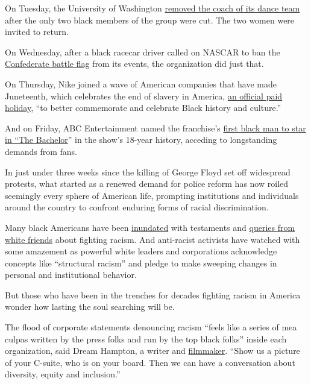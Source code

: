 On Tuesday, the University of Washington
\href{https://www.seattletimes.com/sports/uw-huskies/uw-removes-dance-coach-asks-black-members-to-rejoin-team-and-pledges-to-include-diversity-in-tryout-process/?utm_medium=notification\&utm_source=pushly\&utm_campaign=564808}{removed
the coach of its dance team} after the only two black members of the
group were cut. The two women were invited to return.

On Wednesday, after a black racecar driver called on NASCAR to ban the
\href{https://www.nytimes.com/news-event/confederate-flags-monuments-statues}{Confederate
battle flag} from its events, the organization did just that.

On Thursday, Nike joined a wave of American companies that have made
Juneteenth, which celebrates the end of slavery in America,
\href{https://www.nytimes.com/aponline/2020/06/12/business/ap-juneteenth-company-holiday.html}{an
official paid holiday}, ``to better commemorate and celebrate Black
history and culture.''

And on Friday, ABC Entertainment named the franchise's
\href{https://www.nytimes.com/2020/06/12/arts/television/matt-james-black-bachelor.html}{first
black man to star in ``The Bachelor}'' in the show's 18-year history,
acceding to longstanding demands from fans.

In just under three weeks since the killing of George Floyd set off
widespread protests, what started as a renewed demand for police reform
has now roiled seemingly every sphere of American life, prompting
institutions and individuals around the country to confront enduring
forms of racial discrimination.

Many black Americans have been
\href{https://medium.com/the-faculty/white-academia-do-better-fa96cede1fc5}{inundated}
with testaments and
\href{https://twitter.com/sarahcpr/status/1268231406351613952}{queries
from white friends} about fighting racism. And anti-racist activists
have watched with some amazement as powerful white leaders and
corporations acknowledge concepts like ``structural racism'' and pledge
to make sweeping changes in personal and institutional behavior.

But those who have been in the trenches for decades fighting racism in
America wonder how lasting the soul searching will be.

The flood of corporate statements denouncing racism ``feels like a
series of mea culpas written by the press folks and run by the top black
folks'' inside each organization, said Dream Hampton, a writer and
\href{https://vimeo.com/307655948}{filmmaker}. ``Show us a picture of
your C-suite, who is on your board. Then we can have a conversation
about diversity, equity and inclusion.''


